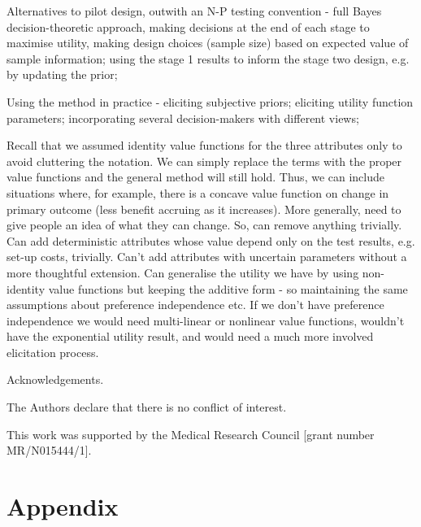 \documentclass[sagev, Crown]{sagej}
\begin{document}
Alternatives to pilot design, outwith an N-P testing convention - full Bayes decision-theoretic approach, making decisions at the end of each stage to maximise utility, making design choices (sample size) based on expected value of sample information; using the stage 1 results to inform the stage two design, e.g. by updating the prior;

Using the method in practice - eliciting subjective priors; eliciting utility function parameters; incorporating several decision-makers with different views;

Recall that we assumed identity value functions for the three attributes only to avoid cluttering the notation. We can simply replace the terms with the proper value functions and the general method will still hold. Thus, we can include situations where, for example, there is a concave value function on change in primary outcome (less benefit accruing as it increases). More generally, need to give people an idea of what they can change. So, can remove anything trivially. Can add deterministic attributes whose value depend only on the test results, e.g. set-up costs, trivially. Can't add attributes with uncertain parameters without a more thoughtful extension. Can generalise the utility we have by using non-identity value functions but keeping the additive form - so maintaining the same assumptions about preference independence etc. If we don't have preference independence we would need multi-linear or nonlinear value functions, wouldn't have the exponential utility result, and would need a much more involved elicitation process.



\begin{acks}
Acknowledgements.
\end{acks}

\begin{dci}
The Authors declare that there is no conflict of interest.
\end{dci}

\begin{funding}
This work was supported by the Medical Research Council [grant number MR/N015444/1].
\end{funding}




\section*{Appendix}
\end{document}
